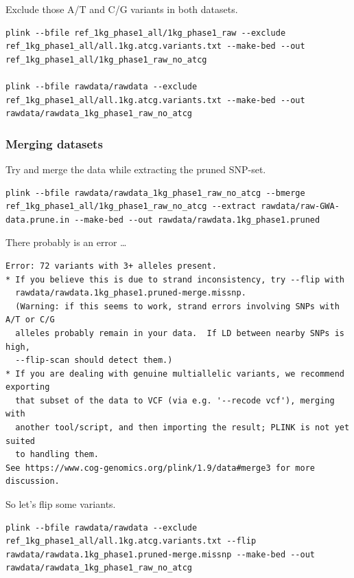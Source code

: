 \documentclass[
]{book}
\begin{document}
Exclude those A/T and C/G variants in both datasets.

\begin{verbatim}
plink --bfile ref_1kg_phase1_all/1kg_phase1_raw --exclude ref_1kg_phase1_all/all.1kg.atcg.variants.txt --make-bed --out ref_1kg_phase1_all/1kg_phase1_raw_no_atcg

plink --bfile rawdata/rawdata --exclude ref_1kg_phase1_all/all.1kg.atcg.variants.txt --make-bed --out rawdata/rawdata_1kg_phase1_raw_no_atcg
\end{verbatim}

\hypertarget{merging-datasets-1}{%
\subsubsection{Merging datasets}\label{merging-datasets-1}}

Try and merge the data while extracting the pruned SNP-set.

\begin{verbatim}
plink --bfile rawdata/rawdata_1kg_phase1_raw_no_atcg --bmerge ref_1kg_phase1_all/1kg_phase1_raw_no_atcg --extract rawdata/raw-GWA-data.prune.in --make-bed --out rawdata/rawdata.1kg_phase1.pruned
\end{verbatim}

There probably is an error \ldots{}

\begin{verbatim}
Error: 72 variants with 3+ alleles present.
* If you believe this is due to strand inconsistency, try --flip with
  rawdata/rawdata.1kg_phase1.pruned-merge.missnp.
  (Warning: if this seems to work, strand errors involving SNPs with A/T or C/G
  alleles probably remain in your data.  If LD between nearby SNPs is high,
  --flip-scan should detect them.)
* If you are dealing with genuine multiallelic variants, we recommend exporting
  that subset of the data to VCF (via e.g. '--recode vcf'), merging with
  another tool/script, and then importing the result; PLINK is not yet suited
  to handling them.
See https://www.cog-genomics.org/plink/1.9/data#merge3 for more discussion.
\end{verbatim}

So let's flip some variants.

\begin{verbatim}
plink --bfile rawdata/rawdata --exclude ref_1kg_phase1_all/all.1kg.atcg.variants.txt --flip rawdata/rawdata.1kg_phase1.pruned-merge.missnp --make-bed --out rawdata/rawdata_1kg_phase1_raw_no_atcg
\end{verbatim}
\end{document}
